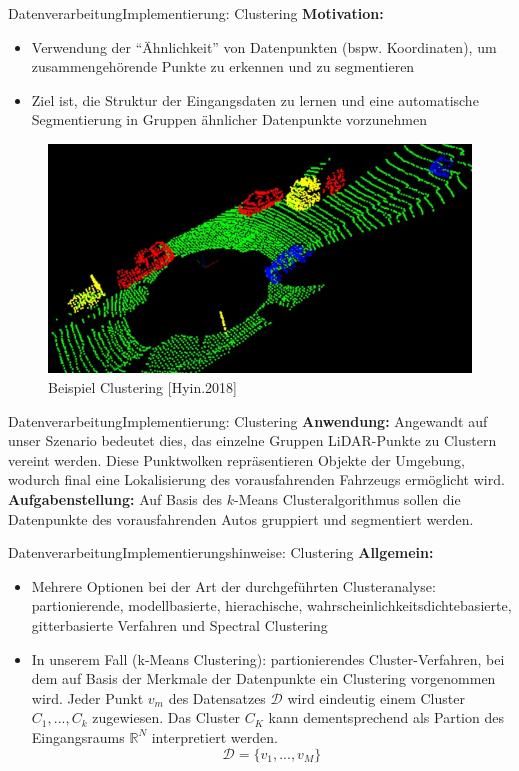 \documentclass[169, handout	]{THIbeamer} %
\begin{document}
	\begin{frame}{Datenverarbeitung}{Implementierung: Clustering}
		\textbf{Motivation:}
		\begin{itemize}
			\item Verwendung der \enquote{Ähnlichkeit} von Datenpunkten (bspw. Koordinaten), um zusammengehörende Punkte zu erkennen und zu segmentieren
			\item Ziel ist, die Struktur der Eingangsdaten zu lernen und eine automatische Segmentierung in Gruppen ähnlicher Datenpunkte vorzunehmen
		\end{itemize}
		\begin{figure}
			\includegraphics[scale=0.3]{required/Clustering.jpg}
			\caption{Beispiel Clustering [Hyin.2018]}
        	\label{Clustering}
		\end{figure}
	\end{frame}
	\begin{frame}{Datenverarbeitung}{Implementierung: Clustering}
		\textbf{Anwendung:} Angewandt auf unser Szenario bedeutet dies, das einzelne Gruppen LiDAR-Punkte zu Clustern vereint werden. Diese Punktwolken repräsentieren Objekte der Umgebung, wodurch final eine Lokalisierung des vorausfahrenden Fahrzeugs ermöglicht wird. \\
		\textbf{Aufgabenstellung:} Auf Basis des $k$-Means Clusteralgorithmus sollen die Datenpunkte des vorausfahrenden Autos gruppiert und segmentiert werden.
	\end{frame}		
	\begin{frame}{Datenverarbeitung}{Implementierungshinweise: Clustering}		
		\textbf{Allgemein:}
		\begin{itemize}
			\item Mehrere Optionen bei der Art der durchgeführten Clusteranalyse: partionierende, modellbasierte, hierachische, wahrscheinlichkeitsdichtebasierte, gitterbasierte Verfahren und Spectral Clustering
			\item In unserem Fall (k-Means Clustering): partionierendes Cluster-Verfahren, bei dem auf Basis der Merkmale der Datenpunkte ein Clustering vorgenommen wird. Jeder Punkt  $v_m$ des Datensatzes $\mathcal{D}$ wird eindeutig einem Cluster $C_1, ..., C_k$ zugewiesen. Das Cluster $C_K$ kann dementsprechend als Partion des Eingangsraums $\mathbb{R}^N$ interpretiert werden.
			\begin{equation}
				\mathcal{D} = \{v_1, ..., v_M \}
			\end{equation}
	\end{itemize}
	\end{frame}
\end{document}
